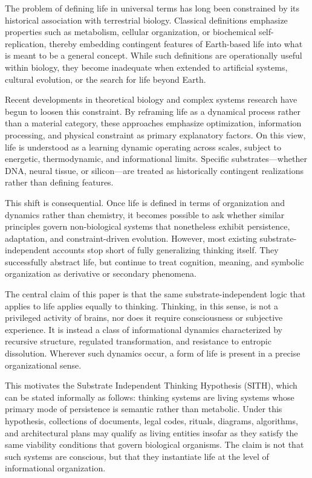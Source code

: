 \documentclass[11pt,oneside]{article}
\begin{document}
The problem of defining life in universal terms has long been constrained by its historical association with terrestrial biology. Classical definitions emphasize properties such as metabolism, cellular organization, or biochemical self-replication, thereby embedding contingent features of Earth-based life into what is meant to be a general concept. While such definitions are operationally useful within biology, they become inadequate when extended to artificial systems, cultural evolution, or the search for life beyond Earth.

Recent developments in theoretical biology and complex systems research have begun to loosen this constraint. By reframing life as a dynamical process rather than a material category, these approaches emphasize optimization, information processing, and physical constraint as primary explanatory factors. On this view, life is understood as a learning dynamic operating across scales, subject to energetic, thermodynamic, and informational limits. Specific substrates—whether DNA, neural tissue, or silicon—are treated as historically contingent realizations rather than defining features.

This shift is consequential. Once life is defined in terms of organization and dynamics rather than chemistry, it becomes possible to ask whether similar principles govern non-biological systems that nonetheless exhibit persistence, adaptation, and constraint-driven evolution. However, most existing substrate-independent accounts stop short of fully generalizing thinking itself. They successfully abstract life, but continue to treat cognition, meaning, and symbolic organization as derivative or secondary phenomena.

The central claim of this paper is that the same substrate-independent logic that applies to life applies equally to thinking. Thinking, in this sense, is not a privileged activity of brains, nor does it require consciousness or subjective experience. It is instead a class of informational dynamics characterized by recursive structure, regulated transformation, and resistance to entropic dissolution. Wherever such dynamics occur, a form of life is present in a precise organizational sense.

This motivates the Substrate Independent Thinking Hypothesis (SITH), which can be stated informally as follows: thinking systems are living systems whose primary mode of persistence is semantic rather than metabolic. Under this hypothesis, collections of documents, legal codes, rituals, diagrams, algorithms, and architectural plans may qualify as living entities insofar as they satisfy the same viability conditions that govern biological organisms. The claim is not that such systems are conscious, but that they instantiate life at the level of informational organization.
\end{document}
